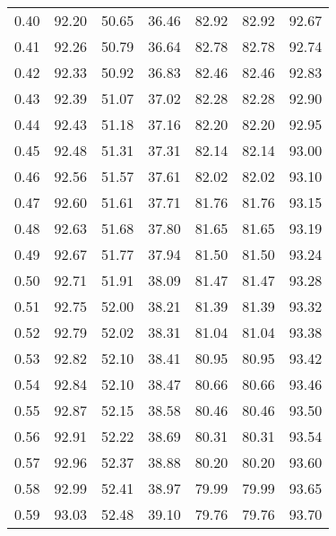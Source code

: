 \begin{tabular}{|c|c|c|c|c|c|c|}
      0.40 &     92.20 &     50.65 &      36.46 &   82.92 &      82.92 &         92.67 \\
      0.41 &     92.26 &     50.79 &      36.64 &   82.78 &      82.78 &         92.74 \\
      0.42 &     92.33 &     50.92 &      36.83 &   82.46 &      82.46 &         92.83 \\
      0.43 &     92.39 &     51.07 &      37.02 &   82.28 &      82.28 &         92.90 \\
      0.44 &     92.43 &     51.18 &      37.16 &   82.20 &      82.20 &         92.95 \\
      0.45 &     92.48 &     51.31 &      37.31 &   82.14 &      82.14 &         93.00 \\
      0.46 &     92.56 &     51.57 &      37.61 &   82.02 &      82.02 &         93.10 \\
      0.47 &     92.60 &     51.61 &      37.71 &   81.76 &      81.76 &         93.15 \\
      0.48 &     92.63 &     51.68 &      37.80 &   81.65 &      81.65 &         93.19 \\
      0.49 &     92.67 &     51.77 &      37.94 &   81.50 &      81.50 &         93.24 \\
      0.50 &     92.71 &     51.91 &      38.09 &   81.47 &      81.47 &         93.28 \\
      0.51 &     92.75 &     52.00 &      38.21 &   81.39 &      81.39 &         93.32 \\
      0.52 &     92.79 &     52.02 &      38.31 &   81.04 &      81.04 &         93.38 \\
      0.53 &     92.82 &     52.10 &      38.41 &   80.95 &      80.95 &         93.42 \\
      0.54 &     92.84 &     52.10 &      38.47 &   80.66 &      80.66 &         93.46 \\
      0.55 &     92.87 &     52.15 &      38.58 &   80.46 &      80.46 &         93.50 \\
      0.56 &     92.91 &     52.22 &      38.69 &   80.31 &      80.31 &         93.54 \\
      0.57 &     92.96 &     52.37 &      38.88 &   80.20 &      80.20 &         93.60 \\
      0.58 &     92.99 &     52.41 &      38.97 &   79.99 &      79.99 &         93.65 \\
      0.59 &     93.03 &     52.48 &      39.10 &   79.76 &      79.76 &         93.70 \\

\end{tabular}
